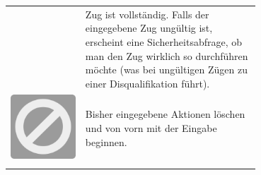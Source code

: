 \documentclass[12pt,a4paper, ngerman, oneside]{scrartcl}
\begin{document}
\begin{table}[h!]
\begin{tabular}{ c m{0.7\linewidth} }
\begin{minipage}{1cm}
    \end{minipage}
    &
    Zug ist vollständig. Falls der eingegebene Zug ungültig ist, erscheint
    eine Sicherheitsabfrage, ob man den Zug wirklich so durchführen möchte (was
    bei ungültigen Zügen zu einer Disqualifikation führt).
    \\
    \begin{minipage}{1cm}
      \includegraphics[width=\linewidth]{bilder/cancel}
    \end{minipage}
    &
    Bisher eingegebene Aktionen löschen und von vorn mit der Eingabe beginnen.
    \\
    \begin{minipage}{1cm}

\end{minipage}
\end{tabular}
\end{table}
\end{document}
